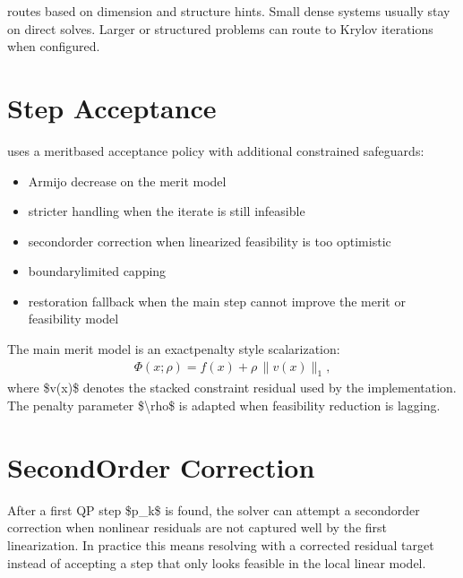 \documentclass[letterpaper,10pt,english]{sphinxmanual}
\begin{document}
\sphinxAtStartPar
{} routes based on dimension and structure hints. Small dense systems usually stay on direct solves. Larger or structured problems can route to Krylov iterations when configured.


\section{Step Acceptance}
\label{\detokenize{optima_sequential_qp:step-acceptance}}
\sphinxAtStartPar
{} uses a merit\sphinxhyphen{}based acceptance policy with additional constrained safeguards:
\begin{itemize}
\item {} 
\sphinxAtStartPar
Armijo decrease on the merit model

\item {} 
\sphinxAtStartPar
stricter handling when the iterate is still infeasible

\item {} 
\sphinxAtStartPar
second\sphinxhyphen{}order correction when linearized feasibility is too optimistic

\item {} 
\sphinxAtStartPar
boundary\sphinxhyphen{}limited capping

\item {} 
\sphinxAtStartPar
restoration fallback when the main step cannot improve the merit or feasibility model

\end{itemize}

\sphinxAtStartPar
The main merit model is an exact\sphinxhyphen{}penalty style scalarization:
\begin{equation*}
\begin{split}\Phi(x;\rho) = f(x) + \rho \, \|v(x)\|_1,\end{split}
\end{equation*}
\sphinxAtStartPar
where \$v(x)\$ denotes the stacked constraint residual used by the implementation. The penalty parameter \$\textbackslash{}rho\$ is adapted when feasibility reduction is lagging.


\section{Second\sphinxhyphen{}Order Correction}
\label{\detokenize{optima_sequential_qp:second-order-correction}}
\sphinxAtStartPar
After a first QP step \$p\_k\$ is found, the solver can attempt a second\sphinxhyphen{}order correction when nonlinear residuals are not captured well by the first linearization. In practice this means re\sphinxhyphen{}solving with a corrected residual target instead of accepting a step that only looks feasible in the local linear model.
\end{document}
